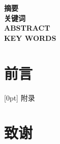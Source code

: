 \documentclass[a4paper,11pt]{article}%
\begin{document}

\makecover
\makeatletter
\begin{center}{ \textbf{ \LARGE{\@title}}}\end{center}
\makeatother
{\flushleft\textbf{\large 摘要}\hspace{2em}}
\\
{\flushleft\textbf{\large 关键词}\hspace{2em}}
\\
{\flushleft\textbf{\large ABSTRACT}\hspace{2em}}
\\
{\flushleft\textbf{\large KEY WORDS}\hspace{2em}}

\newpage
\tableofcontents
\newpage
\section{前\hspace{1em}言}








\appendix{}[0pt]{\vspace{.5\baselineskip}\bfseries}
{附录\thecontentslabel\quad}{}
{\hspace{.5em}\titlerule*[10pt]{$\cdot$}\contentspage}
%
\section*{致谢}

\end{document}
